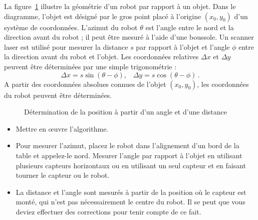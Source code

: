 La figure~\ref{fig.angle-distance} illustre la géométrie d'un robot par rapport à un objet. Dans le diagramme, l'objet est désigné par le gros point placé à l'origine $(x_0,y_0)$ d'un système de coordonnées. L'azimut du robot $\theta$ est l'angle entre le nord et la direction avant du robot ; il peut être mesuré à l'aide d'une boussole. Un scanner laser est utilisé pour mesurer la distance $s$ par rapport à l'objet et l'angle $\phi$ entre la direction avant du robot et l'objet. Les coordonnées relatives $\Delta x$ et $\Delta y$ peuvent être déterminées par une simple trigonométrie :
\[
\Delta x = s \sin (\theta-\phi), \;\;\; \Delta y = s \cos (\theta-\phi)\,.
\]
A partir des coordonnées absolues connues de l'objet $(x_0,y_0)$, les coordonnées du robot peuvent être déterminées.

\begin{figure}
\begin{center}
\caption{Détermination de la position à partir d'un angle et d'une distance}\label{fig.angle-distance}
\end{center}
\end{figure}

\begin{framed}
\begin{itemize}
\item Mettre en œuvre l'algorithme.
\item Pour mesurer l'azimut, placez le robot dans l'alignement d'un bord de la table et appelez-le nord. Mesurer l'angle par rapport à l'objet en utilisant plusieurs capteurs horizontaux ou en utilisant un seul capteur et en faisant tourner le capteur ou le robot.
\item La distance et l'angle sont mesurés à partir de la position où le capteur est monté, qui n'est pas nécessairement le centre du robot. Il se peut que vous deviez effectuer des corrections pour tenir compte de ce fait.
\end{itemize}
\end{framed}

